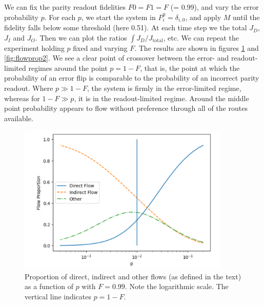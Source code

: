 \documentclass{report}
\begin{document}
\begin{appendices}
We can fix the parity readout fidelities $F0 = F1 = F$ (= 0.99), and vary the error probability $p$. For each $p$, we start the system in $P^0_i = \delta_{i,0}$, and apply $M$ until the fidelity falls below some threshold (here 0.51). At each time step we the total $J_D$, $J_I$ and $J_O$. Then we can plot the ratios $\int J_D/J_\mathrm{total}$, etc. We can repeat the experiment holding $p$ fixed and varying $F$. The results are shown in figures \ref{fig:flowprop1} and \ref{fig:flowprop2}. We see a clear point of crossover between the error- and readout-limited regimes around the point $p = 1-F$, that is, the point at which the probability of an error flip is comparable to the probability of an incorrect parity readout. Where $p \gg 1-F$, the system is firmly in the error-limited regime, whereas for $1-F \gg p$, it is in the readout-limited regime. Around the middle point probability appears to flow without preference through all of the routes available.
\begin{figure}[ht]
    \centering
    \begin{minipage}{0.45\textwidth}
        \centering
        \includegraphics[width=0.9\textwidth]{Figures/flow/f_fixed.png} %
        \caption{Proportion of direct, indirect and other flows (as defined in the text) as a function of $p$ with $F = 0.99$. Note the logarithmic scale. The vertical line indicates $p = 1-F$.}
        \label{fig:flowprop1}
    \end{minipage}\hfill
    \begin{minipage}{0.45\textwidth}
        \centering

\end{minipage}
\end{figure}
\end{appendices}
\end{document}
